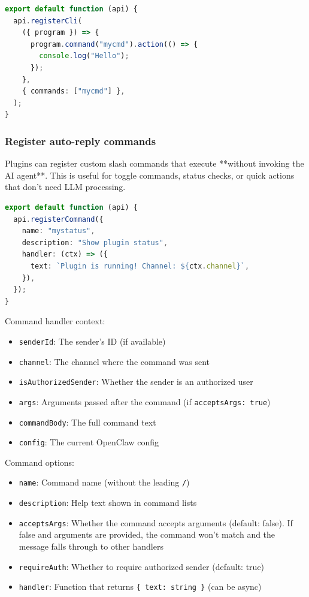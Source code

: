 \begin{lstlisting}[language=typescript]
export default function (api) {
  api.registerCli(
    ({ program }) => {
      program.command("mycmd").action(() => {
        console.log("Hello");
      });
    },
    { commands: ["mycmd"] },
  );
}
\end{lstlisting}


\subsubsection{Register auto-reply commands}


Plugins can register custom slash commands that execute **without invoking the
AI agent**. This is useful for toggle commands, status checks, or quick actions
that don't need LLM processing.

\begin{lstlisting}[language=typescript]
export default function (api) {
  api.registerCommand({
    name: "mystatus",
    description: "Show plugin status",
    handler: (ctx) => ({
      text: `Plugin is running! Channel: ${ctx.channel}`,
    }),
  });
}
\end{lstlisting}


Command handler context:

\begin{itemize}
  \item \texttt{senderId}: The sender's ID (if available)
  \item \texttt{channel}: The channel where the command was sent
  \item \texttt{isAuthorizedSender}: Whether the sender is an authorized user
  \item \texttt{args}: Arguments passed after the command (if \texttt{acceptsArgs: true})
  \item \texttt{commandBody}: The full command text
  \item \texttt{config}: The current OpenClaw config
\end{itemize}


Command options:

\begin{itemize}
  \item \texttt{name}: Command name (without the leading \texttt{/})
  \item \texttt{description}: Help text shown in command lists
  \item \texttt{acceptsArgs}: Whether the command accepts arguments (default: false). If false and arguments are provided, the command won't match and the message falls through to other handlers
  \item \texttt{requireAuth}: Whether to require authorized sender (default: true)
  \item \texttt{handler}: Function that returns \texttt{\{ text: string \}} (can be async)
\end{itemize}


